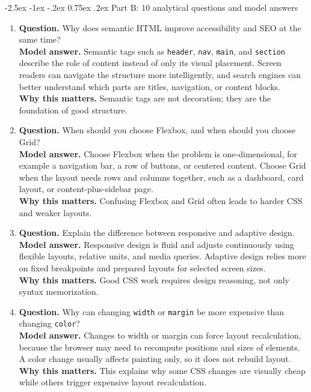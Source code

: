 \documentclass[11pt,a4paper]{article}
\makeatletter
\renewcommand\subsection{\@startsection{subsection}{2}{\z@}%
  {-2.5ex \@plus -1ex \@minus -.2ex}%
  {0.75ex \@plus .2ex}%
  {\normalfont\large\sffamily\bfseries\color{MidnightBlue}}}
\makeatother
\begin{document}
\subsection{Part B: 10 analytical questions and model answers}

\begin{enumerate}
  \item \textbf{Question.} Why does semantic HTML improve accessibility and SEO at the same time?\\
  \textbf{Model answer.} Semantic tags such as \texttt{header}, \texttt{nav}, \texttt{main}, and \texttt{section} describe the role of content instead of only its visual placement. Screen readers can navigate the structure more intelligently, and search engines can better understand which parts are titles, navigation, or content blocks.\\
  \textbf{Why this matters.} Semantic tags are not decoration; they are the foundation of good structure.

  \item \textbf{Question.} When should you choose Flexbox, and when should you choose Grid?\\
  \textbf{Model answer.} Choose Flexbox when the problem is one-dimensional, for example a navigation bar, a row of buttons, or centered content. Choose Grid when the layout needs rows and columns together, such as a dashboard, card layout, or content-plus-sidebar page.\\
  \textbf{Why this matters.} Confusing Flexbox and Grid often leads to harder CSS and weaker layouts.

  \item \textbf{Question.} Explain the difference between responsive and adaptive design.\\
  \textbf{Model answer.} Responsive design is fluid and adjusts continuously using flexible layouts, relative units, and media queries. Adaptive design relies more on fixed breakpoints and prepared layouts for selected screen sizes.\\
  \textbf{Why this matters.} Good CSS work requires design reasoning, not only syntax memorization.

  \item \textbf{Question.} Why can changing \texttt{width} or \texttt{margin} be more expensive than changing \texttt{color}?\\
  \textbf{Model answer.} Changes to width or margin can force layout recalculation, because the browser may need to recompute positions and sizes of elements. A color change usually affects painting only, so it does not rebuild layout.\\
  \textbf{Why this matters.} This explains why some CSS changes are visually cheap while others trigger expensive layout recalculation.


\end{enumerate}
\end{document}
